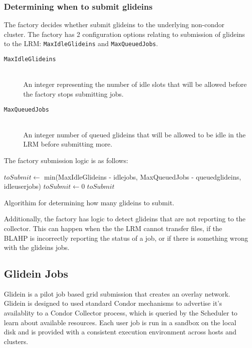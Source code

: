 \documentclass[11pt]{article}
\begin{document}
\subsubsection{Determining when to submit glideins}
The factory decides whether submit glideins to the underlying non-condor cluster.  The factory has 2 configuration options relating to submission of glideins to the LRM: \texttt{MaxIdleGlideins} and \texttt{MaxQueuedJobs}.

\begin{description}
\item[ \texttt{MaxIdleGlideins}] \hfill \\
An integer representing the number of idle slots that will be allowed before the factory stops submitting jobs. 

\item[ \texttt{MaxQueuedJobs}] \hfill \\
An integer number of queued glideins that will be allowed to be idle in the LRM before submitting more. 

\end{description}

The factory submission logic is as follows:

\begin{algorithm}
\begin{algorithmic}
	\STATE $toSubmit \gets$ min(MaxIdleGlideins - idlejobs, MaxQueuedJobs - queuedglideins, idleuserjobs)
\ELSE
	\STATE $toSubmit \gets 0$
\ENDIF
\RETURN $toSubmit$

\end{algorithmic}
\caption{Algorithim for determining how many glideins to submit.}
\end{algorithm}

Additionally, the factory has logic to detect glideins that are not reporting to the collector.  This can happen when the the LRM cannot transfer files, if the BLAHP is incorrectly reporting the status of a job, or if there is something wrong with the glideins jobs.

\subsection{Glidein Jobs}
Glidein  \cite{frey2002condor} is a pilot job based grid submission that creates an overlay network.  Glidein is designed to used standard Condor mechanisms to advertise it's availablity to a Condor Collector process, which is queried by the Scheduler to learn about available resources.  Each user job is run in a sandbox on the local disk and is provided with a consistent execution environment across hosts and clusters.  
\end{document}
